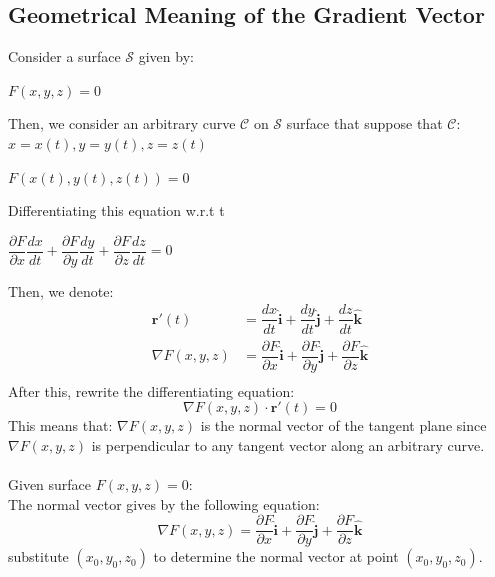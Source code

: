 \documentclass[UTF8,a4paper, 10pt, openany]{book}
\begin{document}
\subsection{Geometrical Meaning of the Gradient Vector}
Consider a surface $\mathcal{S}$ given by:
\begin{center}
$F(x,y,z)=0$
\end{center}
Then, we consider an arbitrary curve $\mathcal{C}$ on $\mathcal{S}$ surface that suppose that $\mathcal{C}$: $x=x(t),y=y(t),z=z(t)$
\begin{center}
$F(x(t),y(t),z(t))=0$
\end{center}
Differentiating this equation w.r.t t
\begin{center}
$\dfrac{\partial F}{\partial x}\dfrac{dx}{dt}+\dfrac{\partial F}{\partial y}\dfrac{dy}{dt}+\dfrac{\partial F}{\partial z}\dfrac{dz}{dt}=0$
\end{center}
Then, we denote:
\begin{align*}
\mathbf{r}'(t)&=\dfrac{dx}{dt}\mathbf{\hat{i}}+\dfrac{dy}{dt}\mathbf{\hat{j}}+\dfrac{dz}{dt}\mathbf{\hat{k}}\\
\nabla F(x,y,z)&=\dfrac{\partial F}{\partial x}\mathbf{\hat{i}}+\dfrac{\partial F}{\partial y}\mathbf{\hat{j}}+\dfrac{\partial F}{\partial z}\mathbf{\hat{k}}\\
\end{align*}
After this, rewrite the differentiating equation:
\begin{equation}
\boxed{
\nabla F(x,y,z)\cdot \mathbf{r}'(t)=0
}
\end{equation}
This means that: $\nabla F(x,y,z)$ is the normal vector of the tangent plane since $\nabla F(x,y,z)$ is perpendicular to any tangent vector along an arbitrary curve.\\ \\
Given surface $F(x,y,z)=0$:\\
The normal vector gives by the following equation:
\begin{equation}
\boxed{
\nabla F(x,y,z)=\dfrac{\partial F}{\partial x}\mathbf{\hat{i}}+\dfrac{\partial F}{\partial y}\mathbf{\hat{j}}+\dfrac{\partial F}{\partial z}\mathbf{\hat{k}}
}
\end{equation}
substitute $(x_0,y_0,z_0)$ to determine the normal vector at point $(x_0,y_0,z_0)$.
\end{document}
